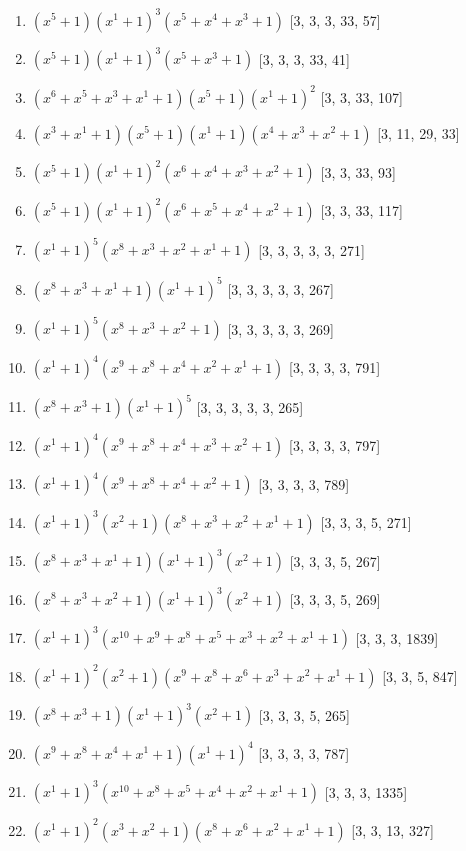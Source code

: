 \documentclass[10pt,twocolumn]{article}
\begin{document}
\begin{enumerate}
\item $(x^{5} + 1)(x^{1} + 1)^{3}(x^{5} + x^{4} + x^{3} + 1)$  [3, 3, 3, 33, 57]
\item $(x^{5} + 1)(x^{1} + 1)^{3}(x^{5} + x^{3} + 1)$  [3, 3, 3, 33, 41]
\item $(x^{6} + x^{5} + x^{3} + x^{1} + 1)(x^{5} + 1)(x^{1} + 1)^{2}$  [3, 3, 33, 107]
\item $(x^{3} + x^{1} + 1)(x^{5} + 1)(x^{1} + 1)(x^{4} + x^{3} + x^{2} + 1)$  [3, 11, 29, 33]
\item $(x^{5} + 1)(x^{1} + 1)^{2}(x^{6} + x^{4} + x^{3} + x^{2} + 1)$  [3, 3, 33, 93]
\item $(x^{5} + 1)(x^{1} + 1)^{2}(x^{6} + x^{5} + x^{4} + x^{2} + 1)$  [3, 3, 33, 117]
\item $(x^{1} + 1)^{5}(x^{8} + x^{3} + x^{2} + x^{1} + 1)$  [3, 3, 3, 3, 3, 271]
\item $(x^{8} + x^{3} + x^{1} + 1)(x^{1} + 1)^{5}$  [3, 3, 3, 3, 3, 267]
\item $(x^{1} + 1)^{5}(x^{8} + x^{3} + x^{2} + 1)$  [3, 3, 3, 3, 3, 269]
\item $(x^{1} + 1)^{4}(x^{9} + x^{8} + x^{4} + x^{2} + x^{1} + 1)$  [3, 3, 3, 3, 791]
\item $(x^{8} + x^{3} + 1)(x^{1} + 1)^{5}$  [3, 3, 3, 3, 3, 265]
\item $(x^{1} + 1)^{4}(x^{9} + x^{8} + x^{4} + x^{3} + x^{2} + 1)$  [3, 3, 3, 3, 797]
\item $(x^{1} + 1)^{4}(x^{9} + x^{8} + x^{4} + x^{2} + 1)$  [3, 3, 3, 3, 789]
\item $(x^{1} + 1)^{3}(x^{2} + 1)(x^{8} + x^{3} + x^{2} + x^{1} + 1)$  [3, 3, 3, 5, 271]
\item $(x^{8} + x^{3} + x^{1} + 1)(x^{1} + 1)^{3}(x^{2} + 1)$  [3, 3, 3, 5, 267]
\item $(x^{8} + x^{3} + x^{2} + 1)(x^{1} + 1)^{3}(x^{2} + 1)$  [3, 3, 3, 5, 269]
\item $(x^{1} + 1)^{3}(x^{10} + x^{9} + x^{8} + x^{5} + x^{3} + x^{2} + x^{1} + 1)$  [3, 3, 3, 1839]
\item $(x^{1} + 1)^{2}(x^{2} + 1)(x^{9} + x^{8} + x^{6} + x^{3} + x^{2} + x^{1} + 1)$  [3, 3, 5, 847]
\item $(x^{8} + x^{3} + 1)(x^{1} + 1)^{3}(x^{2} + 1)$  [3, 3, 3, 5, 265]
\item $(x^{9} + x^{8} + x^{4} + x^{1} + 1)(x^{1} + 1)^{4}$  [3, 3, 3, 3, 787]
\item $(x^{1} + 1)^{3}(x^{10} + x^{8} + x^{5} + x^{4} + x^{2} + x^{1} + 1)$  [3, 3, 3, 1335]
\item $(x^{1} + 1)^{2}(x^{3} + x^{2} + 1)(x^{8} + x^{6} + x^{2} + x^{1} + 1)$  [3, 3, 13, 327]

\end{enumerate}
\end{document}
